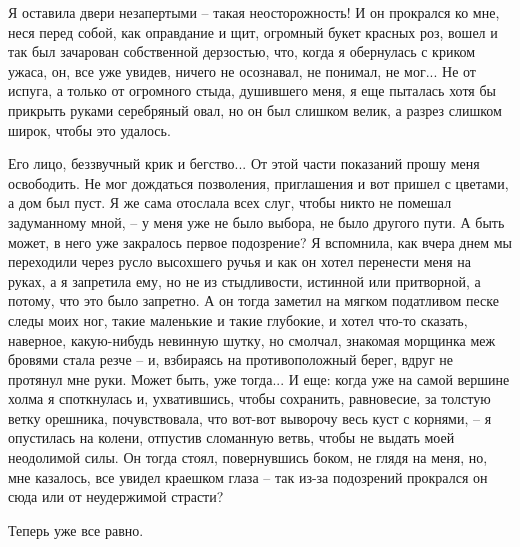 Я оставила двери незапертыми -- такая неосторожность! И он прокрался ко
мне, неся  перед  собой,  как  оправдание и щит, огромный букет красных роз,
вошел и так был зачарован собственной дерзостью, что, когда я  обернулась  с
криком ужаса, он, все уже увидев, ничего не осознавал, не понимал, не мог...
Не  от  испуга,  а только от огромного стыда, душившего меня, я еще пыталась
хотя бы прикрыть руками серебряный овал, но он был слишком велик,  а  разрез
слишком широк, чтобы это удалось.

Его лицо,  беззвучный крик и бегство...  От этой части показаний  прошу меня
освободить. Не мог дождаться позволения, приглашения и вот пришел с цветами,
а  дом был  пуст. Я  же  сама отослала  всех  слуг, чтобы  никто не  помешал
задуманному мной, -- у меня уже не было выбора, не было другого пути. А быть
может, в него  уже закралось первое подозрение? Я вспомнила,  как вчера днем
мы переходили через  русло высохшего ручья и как он  хотел перенести меня на
руках, а я  запретила ему, но не из стыдливости,  истинной или притворной, а
потому, что это было запретно. А он тогда заметил на мягком податливом песке
следы моих  ног, такие маленькие и  такие глубокие, и хотел  что-то сказать,
наверное,  какую-нибудь невинную  шутку, но  смолчал, знакомая  морщинка меж
бровями  стала резче  -- и,  взбираясь  на противоположный  берег, вдруг  не
протянул  мне руки.  Может быть,  уже  тогда... И  еще: когда  уже на  самой
вершине холма я споткнулась и,  ухватившись, чтобы сохранить, равновесие, за
толстую  ветку орешника,  почувствовала, что  вот-вот выворочу  весь куст  с
корнями,  -- я  опустилась на  колени,  отпустив сломанную  ветвь, чтобы  не
выдать моей неодолимой силы. Он тогда стоял, повернувшись боком, не глядя на
меня, но,  мне казалось, все увидел  краешком глаза -- так  из-за подозрений
прокрался он сюда или от неудержимой страсти?

Теперь уже все равно.

